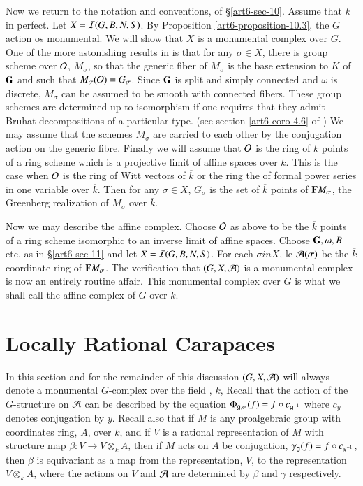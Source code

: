 Now we return to the notation and conventions, of \S \ref{art6-sec-10}. Assume that $\overline{k}$ in perfect. Let $X = \mathcal{I}(G, B, N, S)$. By Proposition \ref{art6-proposition-10.3}, the $G$ action os monumental. We will show that $X$ is a monumental complex over $G$. One of the more astonishing results in \cite{art6-keyBT-II} is that for any $\sigma \in X$, there is group scheme over $\mathcal{O}$, $M_{\sigma}$, so that the generic fiber of $M_{\sigma}$ is the base extension to $K$ of $\mathbf{G}$ and such that $M_{\sigma}(\mathcal{O}) = G_{\sigma}$. Since $\mathbf{G}$ is split and simply connected and $\omega$ is discrete, $M_{\sigma}$ can be assumed to be smooth with connected fibers. These group schemes are determined up to isomorphism if one requires that they admit Bruhat decompositions of a particular type. (see section \ref{art6-coro-4.6} of \cite{art6-keyBT-II}) We may assume that the schemes $M_{\sigma}$ are carried to each other by the conjugation action on the generic fibre. Finally we will assume that $\mathcal{O}$ is the ring of $\overline{k}$ points of a ring scheme which is a projective limit of affine spaces over $\overline{k}$. This is the case when $\mathcal{O}$ is the ring of Witt vectors of $\overline{k}$ or the ring the of formal power series in one variable over $\overline{k}$. Then for any $\sigma \in X$, $G_{\sigma}$ is the set of $\overline{k}$ points of $\mathbf{F} M_{\sigma}$, the Greenberg realization of $M_{\sigma}$ over $\overline{k}$.  

Now we may describe the affine complex. Choose $\mathcal{O}$ as above to be the $\overline{k}$ points of a ring scheme isomorphic to an inverse limit of affine spaces. Choose $\mathbf{G}, \omega, B$ etc. as in \S \ref{art6-sec-11} and let $X = \mathcal{I}(G, B, N, S)$. For each $\sigma in X$, le $\mathcal{A}(\sigma)$ be the $\overline{k}$ coordinate ring of $\mathbf{F} M_{\sigma}$. The verification that $(G, X, \mathcal{A})$ is a monumental complex is now an  entirely routine affair. This monumental complex over $G$ is what we shall call the affine complex of $G$ over $\overline{k}$.

\section{Locally Rational Carapaces}\label{art6-sec-13}
 In this section and for the remainder of this discussion $(G, X, \mathcal{A})$ will always denote a monumental $G$-complex over the field , $k$, Recall that the action of the $G$-structure on $\mathcal{A}$ can be described by the equation $\Phi_{\mathsf{g}, \sigma}(f) = f \circ c_{\mathsf{g}^{-1}}$ where $c_{y}$ denotes conjugation by $y$. Recall also that if $M$ is any proalgebraic group with coordinates ring, $A$, over $k$, and if $V$ is a rational representation of $M$ with structure map $\beta : V \rightarrow V \otimes_{k} A$, then if $M$ acts on $A$ be conjugation,  $\gamma_{\mathsf{g}}(f) = f \circ c_{g^{-1}}$, then $\beta$ is equivariant as a map from the representation, $V$, to the representation $V\otimes_{k} A$, where the actions on $V$ and $\mathcal{A}$ are determined by $\beta$ and $\gamma$ respectively.


